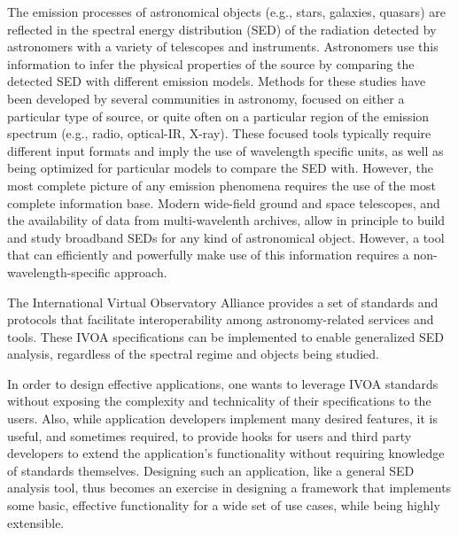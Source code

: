 \documentclass[preprint,authoryear,5p]{elsarticle}
\begin{document}

The emission processes of astronomical objects (e.g., stars, galaxies, quasars)
are reflected in the spectral energy distribution (SED) of the radiation detected
by astronomers with a variety of telescopes and instruments. Astronomers use this
information to infer the physical properties of the source by comparing the
detected SED with different emission models. Methods for these studies have
been developed by several communities in astronomy, focused on either a particular
type of source, or quite often on a particular region of the emission spectrum
(e.g., radio, optical-IR, X-ray). These focused tools typically require different
input formats and imply the use of wavelength specific units, as well as being
optimized for particular models to compare the SED with. However, the most
complete picture of any emission phenomena requires the use of the most complete
information base. Modern wide-field ground and space telescopes, and the
availability of data from multi-wavelenth archives, allow in principle to build
and study broadband SEDs for any kind of astronomical object. However, a tool that can
efficiently and powerfully make use of this information requires a 
non-wavelength-specific approach.

\begin{sloppypar}
The International Virtual
Observatory Alliance \citep[IVOA;][]{2004SPIE.5493..137Q} provides a set of
standards and protocols that facilitate interoperability among astronomy-related
services and tools. These IVOA specifications can be implemented to enable
generalized SED analysis, regardless of the spectral regime
and objects being studied.
\end{sloppypar}

\begin{sloppypar}
In order to design effective applications, one wants
to leverage IVOA standards without exposing the complexity and
technicality of their specifications to the users. Also, while application
developers implement many desired features, it is useful, and sometimes 
required, to provide hooks for users and third party developers to extend
the application's functionality without requiring knowledge of standards themselves.
Designing such an application, like a general SED analysis tool, thus becomes an
exercise in designing a framework that implements some basic,
effective functionality for a wide set of use cases, while being highly extensible.
\end{sloppypar}
\end{document}
